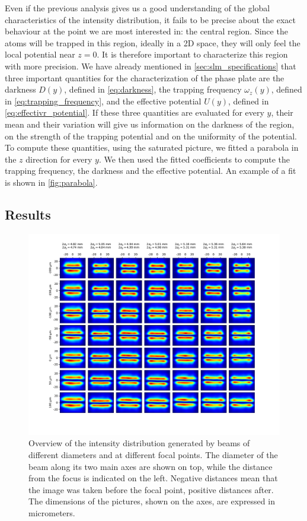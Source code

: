 Even if the previous analysis gives us a good understanding of the global characteristics of the intensity distribution, it fails to be precise about the exact behaviour at the point we are most interested in: the central region. Since the atoms will be trapped in this region, ideally in a 2D space, they will only feel the local potential near $z=0$. It is therefore important to characterize this region with more precision.
We have already mentioned in \cref{sec:slm_specifications} that three important quantities for the characterization of the phase plate are the darkness $D(y)$, defined in \cref{eq:darkness}, the trapping frequency $\omega_z(y)$, defined in \cref{eq:trapping_frequency}, and the effective potential $U(y)$, defined in \cref{eq:effectivr_potential}. If these three quantities are evaluated for every $y$, their mean and their variation will give us information on the darkness of the region, on the strength of the trapping potential and on the uniformity of the potential.
To compute these quantities, using the saturated picture, we fitted a parabola in the $z$ direction for every $y$. We then used the fitted coefficients to compute the trapping frequency, the darkness and the effective potential. An example of a fit is shown in \cref{fig:parabola}.

\subsection{Results}

\begin{figure}
    \centering
    \includegraphics[width=1.3\textwidth, center]{chapters/chapter_3/figures/grid.pdf}
    \caption{Overview of the intensity distribution generated by beams of different diameters and at different focal points. The diameter of the beam along its two main axes are shown on top, while the distance from the focus is indicated on the left.  Negative distances mean that the image was taken before the focal point, positive distances after. The dimensions of the pictures, shown on the axes, are expressed in micrometers.}
    \label{fig:grid}
\end{figure}

